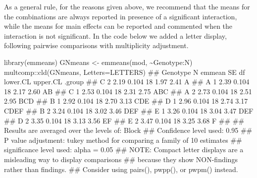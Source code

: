 \documentclass[a4paper,12pt,oneside]{book}
\newenvironment{Shaded}{\begin{snugshade}}{\end{snugshade}}
\newcommand{\SpecialCharTok}[1]{#1}
\newcommand{\DocumentationTok}[1]{#1}
\newcommand{\OtherTok}[1]{#1}
\newcommand{\FunctionTok}[1]{#1}
\newcommand{\AttributeTok}[1]{#1}
\newcommand{\AlertTok}[1]{#1}
\newcommand{\NormalTok}[1]{#1}
\begin{document}
As a general rule, for the reasons given above, we recommend that the means for the combinations are always reported in presence of a significant interaction, while the means for main effects can be reported and commented when the interaction is not significant. In the code below we added a letter display, following pairwise comparisons with multiplicity adjustment.

\vspace{12pt}

\begin{Shaded}
\begin{Highlighting}[]
\FunctionTok{library}\NormalTok{(emmeans)}
\NormalTok{GNmeans }\OtherTok{\textless{}{-}} \FunctionTok{emmeans}\NormalTok{(mod, }\SpecialCharTok{\textasciitilde{}}\NormalTok{Genotype}\SpecialCharTok{:}\NormalTok{N)}
\NormalTok{multcomp}\SpecialCharTok{::}\FunctionTok{cld}\NormalTok{(GNmeans, }\AttributeTok{Letters=}\NormalTok{LETTERS)}
\DocumentationTok{\#\#  Genotype N emmean    SE df lower.CL upper.CL .group }
\DocumentationTok{\#\#  C        2   2.19 0.104 18     1.97     2.41  A     }
\DocumentationTok{\#\#  A        1   2.39 0.104 18     2.17     2.60  AB    }
\DocumentationTok{\#\#  C        1   2.53 0.104 18     2.31     2.75  ABC   }
\DocumentationTok{\#\#  A        2   2.73 0.104 18     2.51     2.95   BCD  }
\DocumentationTok{\#\#  B        1   2.92 0.104 18     2.70     3.13    CDE }
\DocumentationTok{\#\#  D        1   2.96 0.104 18     2.74     3.17    CDEF}
\DocumentationTok{\#\#  B        2   3.24 0.104 18     3.02     3.46     DEF}
\DocumentationTok{\#\#  E        1   3.26 0.104 18     3.04     3.47     DEF}
\DocumentationTok{\#\#  D        2   3.35 0.104 18     3.13     3.56      EF}
\DocumentationTok{\#\#  E        2   3.47 0.104 18     3.25     3.68       F}
\DocumentationTok{\#\# }
\DocumentationTok{\#\# Results are averaged over the levels of: Block }
\DocumentationTok{\#\# Confidence level used: 0.95 }
\DocumentationTok{\#\# P value adjustment: tukey method for comparing a family of 10 estimates }
\DocumentationTok{\#\# significance level used: alpha = 0.05 }
\DocumentationTok{\#\# }\AlertTok{NOTE}\DocumentationTok{: Compact letter displays are a misleading way to display comparisons}
\DocumentationTok{\#\#       because they show NON{-}findings rather than findings.}
\DocumentationTok{\#\#       Consider using \textquotesingle{}pairs()\textquotesingle{}, \textquotesingle{}pwpp()\textquotesingle{}, or \textquotesingle{}pwpm()\textquotesingle{} instead.}
\end{Highlighting}
\end{Shaded}
\end{document}
